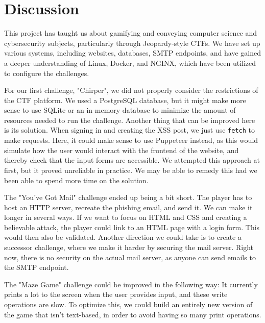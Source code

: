 \section{Discussion}\label{sec:discussion}



This project has taught us about gamifying and conveying computer science and cybersecurity subjects, particularly through Jeopardy-style CTFs. We have set up various systems, including websites, databases, SMTP endpoints, and have gained a deeper understanding of Linux, Docker, and NGINX, which have been utilized to configure the challenges.


For our first challenge, "Chirper", we did not properly consider the restrictions of the CTF platform. We used a PostgreSQL database, but it might make more sense to use SQLite or an in-memory database to minimize the amount of resources needed to run the challenge. Another thing that can be improved here is its solution. When signing in and creating the XSS post, we just use \texttt{fetch} to make requests. Here, it could make sense to use Puppeteer instead, as this would simulate how the user would interact with the frontend of the website, and thereby check that the input forms are accessible. We attempted this approach at first, but it proved unreliable in practice. We may be able to remedy this had we been able to spend more time on the solution.

The "You've Got Mail" challenge ended up being a bit short. The player has to host an HTTP server, recreate the phishing email, and send it. We can make it longer in several ways. If we want to focus on HTML and CSS and creating a believable attack, the player could link to an HTML page with a login form. This would then also be validated. Another direction we could take is to create a successor challenge, where we make it harder by securing the mail server. Right now, there is no security on the actual mail server, as anyone can send emails to the SMTP endpoint.

The "Maze Game" challenge could be improved in the following way: It currently prints a lot to the screen when the user provides input, and these write operations are slow. To optimize this, we could build an entirely new version of the game that isn't text-based, in order to avoid having so many print operations.

